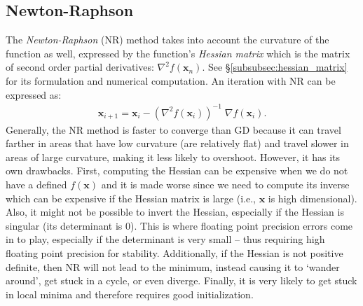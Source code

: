 \documentclass[11pt, letterpaper]{extarticle} %
\begin{document}
\subsection{Newton-Raphson}\label{subsec:newton-raphson}
The \textit{Newton-Raphson} (NR) method takes into account the curvature of the function as well, expressed by the function's \textit{Hessian matrix} which is the matrix of second order partial derivatives: $\nabla^2 f(\mathbf{x}_n)$. See \S\ref{subsubsec:hessian_matrix} for its formulation and numerical computation. An iteration with NR can be expressed as:
\begin{align} \label{eq:newton-raphson}
    \mathbf{x}_{i+1} = \mathbf{x}_i - \left( \nabla^2 f(\mathbf{x}_i) \right)^{-1} \; \nabla f(\mathbf{x}_i).
\end{align}
Generally, the NR method is faster to converge than GD because it can travel farther in areas that have low curvature (are relatively flat) and travel slower in areas of large curvature, making it less likely to overshoot. However, it has its own drawbacks. First, computing the Hessian can be expensive when we do not have a defined $f(\mathbf{x})$ and it is made worse since we need to compute its inverse which can be expensive if the Hessian matrix is large (i.e., $\mathbf{x}$ is high dimensional). Also, it might not be possible to invert the Hessian, especially if the Hessian is singular (its determinant is 0). This is where floating point precision errors come in to play, especially if the determinant is very small -- thus requiring high floating point precision for stability. Additionally, if the Hessian is not positive definite, then NR will not lead to the minimum, instead causing it to `wander around', get stuck in a cycle, or even diverge. Finally, it is very likely to get stuck in local minima and therefore requires good initialization.
\end{document}
